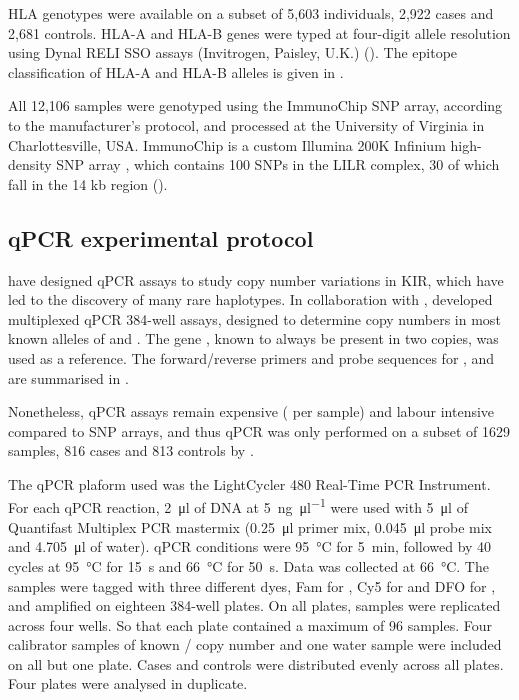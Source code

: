 HLA genotypes were available on a subset of 5,603 individuals, 2,922 cases and 2,681 controls.
HLA-A and HLA-B genes were typed at four-digit allele resolution using Dynal RELI SSO assays (Invitrogen, Paisley, U.K.) ().
The epitope classification of HLA-A and HLA-B alleles is given in .

All 12,106 samples were genotyped using the ImmunoChip SNP array,
according to the manufacturer's protocol, and processed at the University of Virginia in Charlottesville, USA.
ImmunoChip is a custom Illumina 200K Infinium high-density SNP array \citep{Nikula:2005bh}, which
contains 100 SNPs in the LILR complex, 30 of which fall in the 14 kb  region ().



\subsection{qPCR experimental protocol}

\citet{Jiang:2012cf} have designed \gls{qPCR}
assays to study copy number variations in KIR, which have led to the discovery of many rare haplotypes.
In collaboration with \citet{Jiang:2012cf},  developed multiplexed qPCR 384-well assays,
designed to determine copy numbers in most known alleles of  and .
The gene , known to always be present in two copies, was used as a reference.
The forward/reverse primers and probe sequences for ,  and  are summarised in .

Nonetheless, qPCR assays remain expensive ( per sample) and labour intensive compared to SNP arrays,
and thus qPCR was only performed on a subset of 1629 samples, 816 cases and 813 controls by .

The qPCR plaform used was the LightCycler 480 Real-Time PCR Instrument.
For each qPCR reaction, \SI{2}{\micro\litre} of DNA at \SI{5}{\nano\gram\per\micro\litre} were used with \SI{5}{\micro\litre} of Quantifast Multiplex PCR mastermix (\SI{0.25}{\micro\litre} primer mix, \SI{0.045}{\micro\litre} probe mix and \SI{4.705}{\micro\litre} of water).
qPCR conditions were \SI{95}{\degreeCelsius} for \SI{5}{\minute}, followed by 40 cycles at \SI{95}{\degreeCelsius} for \SI{15}{\second} and \SI{66}{\degreeCelsius} for \SI{50}{\second}.
Data was collected at \SI{66}{\degreeCelsius}.
The samples were tagged with three different dyes, Fam for , Cy5 for  and DFO for , and amplified on eighteen 384-well plates.
On all plates, samples were replicated across four wells.
So that each plate contained a maximum of 96 samples.
Four calibrator samples of known / copy number and one water sample were included on all but one plate.
Cases and controls were distributed evenly across all plates.
Four plates were analysed in duplicate.

